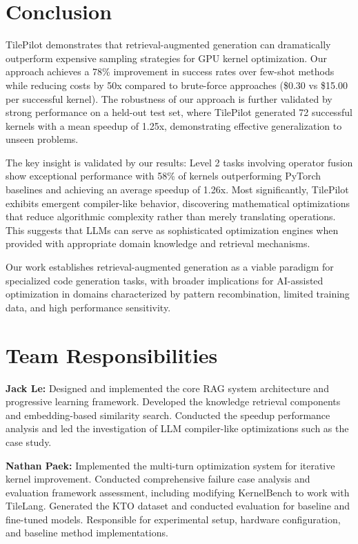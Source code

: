 \documentclass{article}
\begin{document}
\section{Conclusion}

TilePilot demonstrates that retrieval-augmented generation can dramatically outperform expensive sampling strategies for GPU kernel optimization. Our approach achieves a 78\% improvement in success rates over few-shot methods while reducing costs by 50x compared to brute-force approaches (\$0.30 vs \$15.00 per successful kernel). The robustness of our approach is further validated by strong performance on a held-out test set, where TilePilot generated 72 successful kernels with a mean speedup of 1.25x, demonstrating effective generalization to unseen problems.

The key insight is validated by our results: Level 2 tasks involving operator fusion show exceptional performance with 58\% of kernels outperforming PyTorch baselines and achieving an average speedup of 1.26x. Most significantly, TilePilot exhibits emergent compiler-like behavior, discovering mathematical optimizations that reduce algorithmic complexity rather than merely translating operations. This suggests that LLMs can serve as sophisticated optimization engines when provided with appropriate domain knowledge and retrieval mechanisms.

Our work establishes retrieval-augmented generation as a viable paradigm for specialized code generation tasks, with broader implications for AI-assisted optimization in domains characterized by pattern recombination, limited training data, and high performance sensitivity.

\section{Team Responsibilities}

\textbf{Jack Le:} Designed and implemented the core RAG system architecture and progressive learning framework. Developed the knowledge retrieval components and embedding-based similarity search. Conducted the speedup performance analysis and led the investigation of LLM compiler-like optimizations such as the case study.

\textbf{Nathan Paek:} Implemented the multi-turn optimization system for iterative kernel improvement. Conducted comprehensive failure case analysis and evaluation framework assessment, including modifying KernelBench to work with TileLang. Generated the KTO dataset and conducted evaluation for baseline and fine-tuned models. Responsible for experimental setup, hardware configuration, and baseline method implementations.
\end{document}
